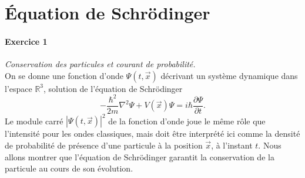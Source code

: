 \section{Équation de Schrödinger}

\paragraph{Exercice 1} \textit{Conservation des particules et courant de probabilité.} \\
On se donne une fonction d'onde $\Psi(t,\vec x)$ décrivant un système dynamique dans l'espace $\mathbb R^3$, solution de l'équation de Schrödinger 
\begin{equation}
\boxed{
-\frac{\hbar^2}{2m} \nabla^2 \Psi + V(\vec x) \Psi = i\hbar \frac{\partial\Psi}{\partial t}.
}
\end{equation}
Le module carré $|\Psi(t,\vec x)|^2$ de la fonction d'onde joue le même rôle que l'intensité pour les ondes classiques, mais doit être interprété ici comme la densité de probabilité de présence d'une particule à la position $\vec x$, à l'instant $t$. Nous allons montrer que l'équation de Schrödinger garantit la conservation de la particule au cours de son évolution. 
